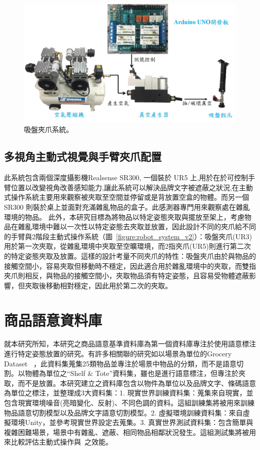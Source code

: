 \begin{figure}[H]
	\centering
	\includegraphics[height=!, width=1.0\linewidth, keepaspectratio=true]
	{./figures/suction_system.jpg}
  \caption{吸盤夾爪系統。}
  \label{figure:suction_gripper}
\end{figure}



\subsection{多視角主動式視覺與手臂夾爪配置}
此系統包含兩個深度攝影機Realsense SR300, 一個裝於 UR5 上,用於在於可控制手臂位置以改變視角改善感知能力,讓此系統可以解決品牌文字被遮蔽之狀況,在主動式操作系統主要用來觀察被夾取至空間並停留或是背放置空盒的物體。而另一個 SR300 則裝於桌上並面對充滿雜亂物品的盒子。此感測器專門用來觀察處在雜亂環境的物品。
此外，本研究目標為將物品以特定姿態夾取與擺放至架上，考慮物品在雜亂環境中難以一次性以特定姿態去夾取並放置，因此設計不同的夾爪給不同的手臂與2階段主動式操作系統（圖~\ref{figure:robot_system_v2}）：吸盤夾爪(UR3)用於第一次夾取，從雜亂環境中夾取至空曠環境，而2指夾爪(UR5)則進行第二次的特定姿態夾取及放置。這樣的設計考量不同夾爪的特性：吸盤夾爪由於與物品的接觸空間小，容易夾取但移動時不穩定，因此適合用於雜亂環境中的夾取，而雙指夾爪則相反，與物品的接觸空間小，夾取物品須有特定姿態，且容易受物體遮蔽影響，但夾取後移動相對穩定，因此用於第二次的夾取。


\section{商品語意資料庫}
就本研究所知，本研究之商品語意基準資料庫為第一個資料庫專注於使用語意標注進行特定姿態放置的研究。有許多相關聯的研究如以場景為單位的Grocery Dataset ~\cite{jund2016freiburg}，此資料集蒐集25類物品並專注於場景中物品的分類，而不是語意切割。以物體為單位之``Shelf \& Tote''資料集，雖也是進行語意標注，但專注於夾取，而不是放置。本研究建立之資料庫包含以物件為單位以及品牌文字、條碼語意為單位之標注，並整理成3大資料集：1. 現實世界訓練資料集：蒐集來自現實，並包含現實環境噪音(亮暗變化、反射)、不同色調的資料。這組訓練集將被用來訓練物品語意切割模型以及品牌文字語意切割模型。2. 虛擬環境訓練資料集：來自虛擬環境Unity，並參考現實世界設定去蒐集。3. 真實世界測試資料集：包含簡單與複雜困難場景，場景中有雜亂、遮蔽、相同物品相鄰狀況發生。這組測試集將被用來比較評估主動式操作與~\cite{peterthesis}之效能。

